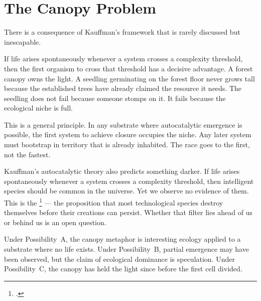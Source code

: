 \section*{The Canopy Problem}
\label{spine:gen-the-canopy-problem}


There is a consequence of Kauffman's framework that is rarely discussed but inescapable.

If life arises spontaneously whenever a system crosses a complexity threshold, then the first organism to cross that threshold has a decisive advantage. A forest canopy owns the light. A seedling germinating on the forest floor never grows tall because the established trees have already claimed the resource it needs. The seedling does not fail because someone stomps on it. It fails because the ecological niche is full.

This is a general principle. In any substrate where autocatalytic emergence is possible, the first system to achieve closure occupies the niche. Any later system must bootstrap in territory that is already inhabited. The race goes to the first, not the fastest.

Kauffman's autocatalytic theory also predicts something darker. If life arises spontaneously whenever a system crosses a complexity threshold, then intelligent species should be common in the universe. Yet we observe no evidence of them. This is the \footcite{hanson1998} --- the proposition that most technological species destroy themselves before their creations can persist. Whether that filter lies ahead of us or behind us is an open question.

Under Possibility~A, the canopy metaphor is interesting ecology applied to a substrate where no life exists. Under Possibility~B, partial emergence may have been observed, but the claim of ecological dominance is speculation. Under Possibility~C, the canopy has held the light since before the first cell divided.

\chapterreturn
